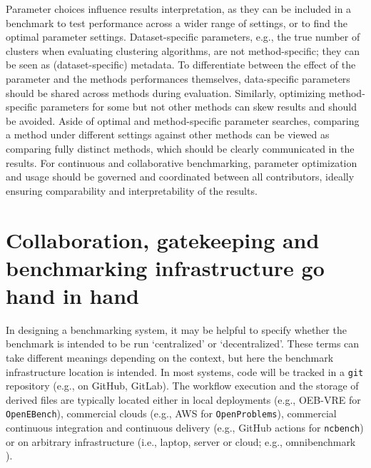 \documentclass[11pt]{article}
\begin{document}
Parameter choices influence results interpretation, as they can be included in a benchmark to test performance across a wider range of settings, or to find the optimal parameter settings. 
Dataset-specific parameters, e.g., the true number of clusters when evaluating clustering algorithms, are not method-specific; they can be seen as (dataset-specific) metadata. To differentiate between the effect of the parameter and the methods performances themselves, data-specific parameters should be shared across methods during evaluation.
Similarly, optimizing method-specific parameters for some but not other methods can skew results and should be avoided. 
Aside of optimal and method-specific parameter searches, comparing a method under different settings against other methods can be viewed as comparing fully distinct methods, which should be clearly communicated in the results. 
For continuous and collaborative benchmarking, parameter optimization and usage should be governed and coordinated between all contributors, ideally ensuring comparability and interpretability of the results. 

\section*{Collaboration, gatekeeping and benchmarking infrastructure go hand in hand}

In designing a benchmarking system, it may be helpful to specify whether the benchmark is intended to be run `centralized' or `decentralized'. These terms can take different meanings depending on the context, but here the benchmark infrastructure location is intended. In most systems, code will be tracked in a \texttt{git} repository (e.g., on GitHub, GitLab). The workflow execution and the storage of derived files are typically located either in local deployments (e.g., OEB-VRE for \texttt{OpenEBench}), commercial clouds (e.g., AWS for \texttt{OpenProblems}), commercial continuous integration and continuous delivery (e.g., GitHub actions for \texttt{ncbench}) or on arbitrary infrastructure (i.e., laptop, server or cloud; e.g., omnibenchmark \cite{omnibenchmark}). 
\end{document}
